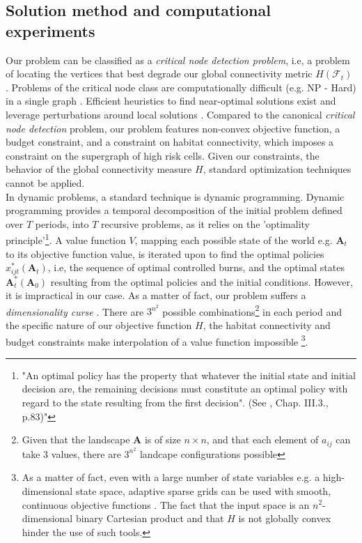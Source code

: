 \subsection{Solution method and computational experiments}
Our problem can be classified as a \textit{critical node detection problem}, i.e, a problem of locating the vertices that best degrade our global connectivity metric $H(\mathcal{F}_t)$ \citep{ARULSELVAN20092193}. Problems of the critical node class are computationally difficult (e.g. NP - Hard) in a single graph \citep{ARULSELVAN20092193, matsypura_wildfire_2018}. Efficient heuristics to find near-optimal solutions exist and leverage perturbations around local solutions \citep{ARULSELVAN20092193, Zhou2017}. Compared to the canonical \textit{critical node detection} problem, our problem features non-convex objective function, a budget constraint, and a constraint on habitat connectivity, which imposes a constraint on the supergraph of high risk cells. Given our constraints, the behavior of the global connectivity measure $H$, standard optimization techniques cannot be applied. \\
In dynamic problems, a standard technique is dynamic programming. Dynamic programming provides a temporal decomposition of the initial problem defined over $T$ periods, into $T$ recursive problems, as it relies on the 'optimality principle'\footnote{"An optimal policy has the property that whatever the initial state and initial decision are, the remaining decisions must constitute an optimal policy with regard to the state resulting from the first decision". (See \cite{Bellman}, Chap. III.3., p.83)"}. A value function $V$, mapping each possible state of the world e.g. $\mathbf{A}_t$ to its objective function value, is iterated upon to find the optimal policies $x_{ijt}^*(\mathbf{A}_t)$, i.e, the sequence of optimal controlled burns, and the optimal states $\mathbf{A}_t^*(\mathbf{A}_0)$ resulting from the optimal policies and the initial conditions.
However, it is impractical in our case. As a matter of fact, our problem suffers a \textit{dimensionality curse} \citep{Bellman}. There are $3^{n^2}$ possible combinations\footnote{Given that the landscape $\mathbf{A}$ is of size $n\times n$, and that each element of $a_{ij}$ can take 3 values, there are $3^{n^2}$ landcape configurations possible} in each period and the specific nature of our objective function $H$, the habitat connectivity and budget constraints make interpolation of a value function impossible \footnote{As a matter of fact, even with a large number of state variables e.g. a high-dimensional state space, adaptive sparse grids can be used with smooth, continuous objective functions \citep{brumm_adaptive_2017}. The fact that the input space is an $n^2$-dimensional binary Cartesian product and that $H$ is not globally convex hinder the use of such tools.}. 

